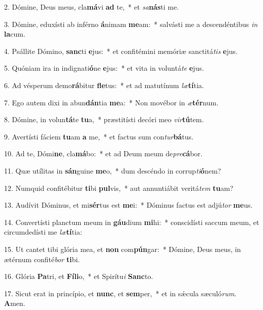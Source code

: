 2. Dómine, Deus meus, cla\textbf{má}vi \textbf{ad} te,~*  et \textit{sa}\textbf{nás}ti me.\

3. Dómine, eduxísti ab inférno \textbf{á}nimam \textbf{me}am:~*  salvásti me a descendéntibus \textit{in} \textbf{la}cum.\

4. Psállite Dómino, \textbf{sanc}ti \textbf{e}jus:~*  et confitémini memóriæ sanctitá\textit{tis} \textbf{e}jus.\

5. Quóniam ira in indignati\textbf{ó}ne \textbf{e}jus:~*  et vita in voluntá\textit{te} \textbf{e}jus.\

6. Ad vésperum demo\textbf{rá}bitur \textbf{fle}tus:~*  et ad matutínum \textit{læ}\textbf{tí}tia.\

7. Ego autem dixi in abun\textbf{dán}tia \textbf{me}a:~*  Non movébor in \textit{æ}\textbf{tér}num.\

8. Dómine, in volun\textbf{tá}te \textbf{tu}a,~*  præstitísti decóri meo \textit{vir}\textbf{tú}tem.\

9. Avertísti fáciem \textbf{tu}am \textbf{a} me,~*  et factus sum con\textit{tur}\textbf{bá}tus.\

10. Ad te, Dómi\textbf{ne}, cla\textbf{má}bo:~*  et ad Deum meum de\textit{pre}\textbf{cá}bor.\

11. Quæ utílitas in \textbf{sán}guine \textbf{me}o,~*  dum descéndo in corrup\textit{ti}\textbf{ó}nem?\

12. Numquid confitébitur \textbf{ti}bi \textbf{pul}vis,~*  aut annuntiábit veritá\textit{tem} \textbf{tu}am?\

13. Audívit Dóminus, et mi\textbf{sér}tus est \textbf{me}i:~*  Dóminus factus est adjú\textit{tor} \textbf{me}us.\

14. Convertísti planctum meum in \textbf{gáu}dium \textbf{mi}hi:~*  conscidísti saccum meum, et circumdedísti me \textit{læ}\textbf{tí}tia:\

15. Ut cantet tibi glória mea, et \textbf{non} com\textbf{pún}gar:~*  Dómine, Deus meus, in ætérnum confité\textit{bor} \textbf{ti}bi.\

16. Glória \textbf{Pa}tri, et \textbf{Fí}\textbf{li}o,~*  et Spirítu\textit{i} \textbf{Sanc}to.\

17. Sicut erat in princípio, et \textbf{nunc}, et \textbf{sem}per,~*  et in sǽcula sæculó\textit{rum}. \textbf{A}men.\

